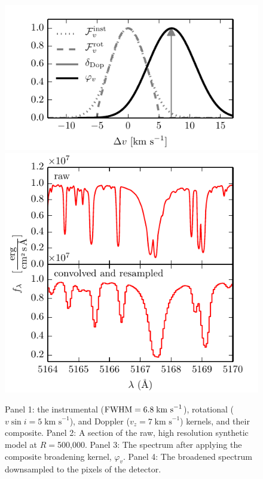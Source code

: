 \documentclass[iop,floatfix]{emulateapj}
\newcommand{\kms}{ \textrm{km s}^{-1} }
\begin{document}
\begin{figure}[!t]
\begin{center}
  \includegraphics{figs/kernels.pdf}
  \includegraphics{figs/high2low.pdf}
  \caption{Panel 1: the instrumental (${\rm FWHM} =6.8\;\kms$), rotational ($v \sin i = 5\;\kms$), and Doppler ($v_z = 7\;\kms$) kernels, and their composite. Panel 2: A section of the raw, high resolution synthetic model at $R=$500,000. Panel 3: The spectrum after applying the composite broadening kernel, $\varphi_v$. Panel 4: The broadened spectrum downsampled to the pixels of the detector.}
\label{fig:broadening}
\end{center}
\end{figure}
\end{document}
